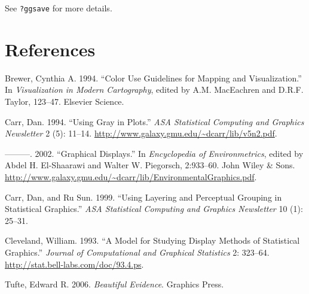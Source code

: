 See \texttt{?ggsave} for more details.

\section*{References}

Brewer, Cynthia A. 1994. ``Color Use Guidelines for Mapping and
Visualization.'' In \emph{Visualization in Modern Cartography}, edited
by A.M. MacEachren and D.R.F. Taylor, 123--47. Elsevier Science.

Carr, Dan. 1994. ``Using Gray in Plots.'' \emph{ASA Statistical
Computing and Graphics Newsletter} 2 (5): 11--14.
\url{http://www.galaxy.gmu.edu/~dcarr/lib/v5n2.pdf}.

---------. 2002. ``Graphical Displays.'' In \emph{Encyclopedia of
Environmetrics}, edited by Abdel H. El-Shaarawi and Walter W. Piegorsch,
2:933--60. John Wiley \& Sons.
\url{http://www.galaxy.gmu.edu/~dcarr/lib/EnvironmentalGraphics.pdf}.

Carr, Dan, and Ru Sun. 1999. ``Using Layering and Perceptual Grouping in
Statistical Graphics.'' \emph{ASA Statistical Computing and Graphics
Newsletter} 10 (1): 25--31.

Cleveland, William. 1993. ``A Model for Studying Display Methods of
Statistical Graphics.'' \emph{Journal of Computational and Graphical
Statistics} 2: 323--64. \url{http://stat.bell-labs.com/doc/93.4.ps}.

Tufte, Edward R. 2006. \emph{Beautiful Evidence}. Graphics Press.
